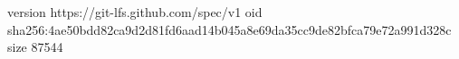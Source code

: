 version https://git-lfs.github.com/spec/v1
oid sha256:4ae50bdd82ca9d2d81fd6aad14b045a8e69da35cc9de82bfca79e72a991d328c
size 87544
